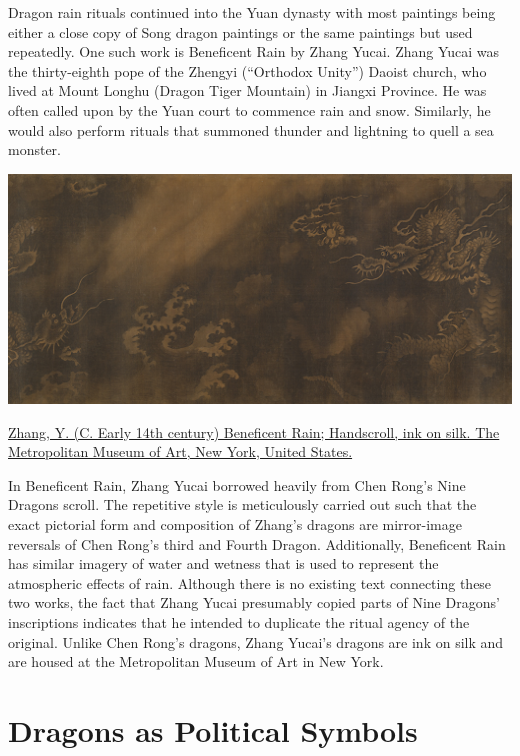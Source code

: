 \documentclass[
]{book}
\begin{document}
Dragon rain rituals continued into the Yuan dynasty with most paintings being either a close copy of Song dragon paintings or the same paintings but used repeatedly. One such work is Beneficent Rain by Zhang Yucai. Zhang Yucai was the thirty-eighth pope of the Zhengyi (``Orthodox Unity'') Daoist church, who lived at Mount Longhu (Dragon Tiger Mountain) in Jiangxi Province. He was often called upon by the Yuan court to commence rain and snow. Similarly, he would also perform rituals that summoned thunder and lightning to quell a sea monster.

\includegraphics[width=1.2\textwidth,height=\textheight]{images/beneficent_Rain.png}

\href{https://www.metmuseum.org/art/collection/search/40454}{Zhang, Y. (C. Early 14th century) Beneficent Rain; Handscroll, ink on silk. The Metropolitan Museum of Art, New York, United States.}

In Beneficent Rain, Zhang Yucai borrowed heavily from Chen Rong's Nine Dragons scroll. The repetitive style is meticulously carried out such that the exact pictorial form and composition of Zhang's dragons are mirror-image reversals of Chen Rong's third and Fourth Dragon. Additionally, Beneficent Rain has similar imagery of water and wetness that is used to represent the atmospheric effects of rain. Although there is no existing text connecting these two works, the fact that Zhang Yucai presumably copied parts of Nine Dragons' inscriptions indicates that he intended to duplicate the ritual agency of the original. Unlike Chen Rong's dragons, Zhang Yucai's dragons are ink on silk and are housed at the Metropolitan Museum of Art in New York.

\hypertarget{ming}{%
\chapter*{Dragons as Political Symbols}\label{ming}}
\end{document}
